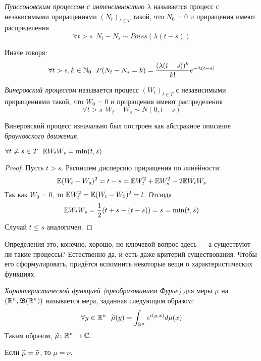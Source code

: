 \begin{definition}
	\textit{Пуассоновским процессом с интенсивностью $\lambda$} называется процесс с независимыми приращениями $(N_t)_{t \in T}$ такой, что $N_0 = 0$ и приращения имеют распределения
	\[
		\forall t > s\ \ N_t - N_s \sim Poiss(\lambda(t - s))
	\]
\end{definition}

\begin{note}
	Иначе говоря:
	\[
		\forall t > s, k \in \mathbb{N}_0\ \ P(N_t - N_s = k) = \frac{(\lambda(t - s))^k}{k!}e^{-\lambda(t - s)}
	\]
\end{note}

\begin{definition}
	\textit{Винеровский процессом} называется процесс $(W_t)_{t \in T}$ с независимыми приращениями такой, что $W_0 = 0$ и приращения имеют распределения
	\[
		\forall t > s\ \ W_t - W_s \sim N(0, t - s)
	\]
\end{definition}

\begin{note}
	Винеровский процесс изначально был построен как абстракное описание \textit{броуновского движения}.
\end{note}

\begin{proposition}
	$\forall t \neq s \in T\ \ \mathbb{E} W_tW_s = \min(t, s)$
\end{proposition}

\begin{proof}
	Пусть $t > s$. Распишем дисперсию приращения по линейности:
	\[
		\mathbb{E}(W_t - W_s)^2 = t - s = \mathbb{E} W_t^2 + \mathbb{E} W_s^2 - 2\mathbb{E} W_tW_s
	\]
	Так как $W_0 = 0$, то $\mathbb{E} W_t^2 = \mathbb{E} (W_t - W_0)^2 = t$. Отсюда
	\[
		\mathbb{E} W_t W_s = \frac{1}{2} (t + s - (t - s)) = s = \min(t, s)
	\]
	Случай $t \le s$ аналогичен.
\end{proof}

\begin{note}
	Определения это, конечно, хорошо, но ключевой вопрос здесь --- а существуют ли такие процессы? Естественно да, и есть даже критерий существования. Чтобы его сформулировать, придётся вспомнить некоторые вещи о характеристических функциях.
\end{note}

\begin{reminder}
	\textit{Характеристической функцией (преобразованием Фурье)} для меры $\mu$ на $(\mathbb{R}^n, \mathfrak{B}(\mathbb{R}^n))$ называется мера, заданная следующим образом:
	\[
		\forall y \in \mathbb{R}^n\ \ \widetilde{\mu}(y) = \int_{\mathbb{R}^n} e^{i(y, x)}d\mu(x)
	\]
	Таким образом, $\widetilde{\mu} \colon \mathbb{R}^n \to \mathbb{C}$.
\end{reminder}

\begin{reminder}
	Если $\widetilde{\mu} = \widetilde{\nu}$, то $\mu = \nu$.
\end{reminder}
